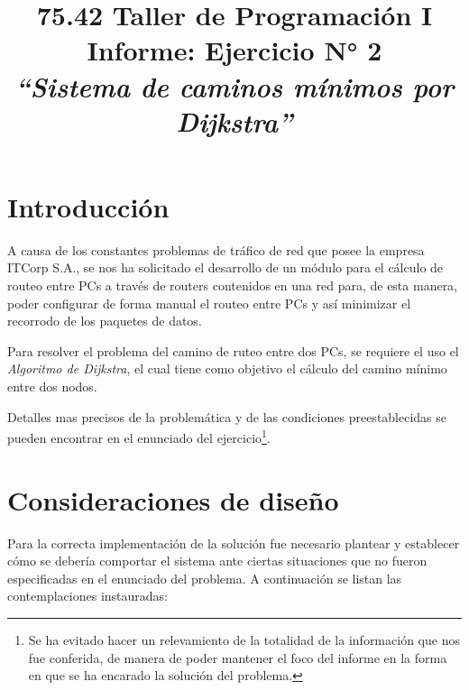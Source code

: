 \documentclass{article}
\begin{document}
\title{\Large 75.42 Taller de Programación I \\ 
	  \medskip\Huge Informe: Ejercicio N° 2  \\
	  \bigskip\Large\textit{``Sistema de caminos mínimos por Dijkstra''}}
\date{}
\maketitle




\section{Introducción}
	
	A causa de los constantes problemas de tráfico de red que posee la empresa ITCorp S.A., se nos ha solicitado el desarrollo de un módulo para el cálculo de routeo entre PCs a través de routers contenidos en una red para, de esta manera, poder configurar de forma manual el routeo entre PCs y así minimizar el recorrodo de los paquetes de datos.
	\par
	Para resolver el problema del camino de ruteo entre dos PCs, se requiere el uso el \textit{Algoritmo de Dijkstra}, el cual tiene como objetivo el cálculo del camino mínimo entre dos nodos.
	\par
	Detalles mas precisos de la problemática y de las condiciones preestablecidas se pueden encontrar en el enunciado del ejercicio\footnote{Se ha evitado hacer un relevamiento de la totalidad de la información que nos fue conferida, de manera de poder mantener el foco del informe en la forma en que se ha encarado la solución del problema.}.
\bigskip




\section{Consideraciones de diseño}

	Para la correcta implementación de la solución fue necesario plantear y establecer cómo se debería comportar el sistema ante ciertas situaciones que no fueron especificadas en el enunciado del problema. A continuación se listan las contemplaciones instauradas:
\end{document}
